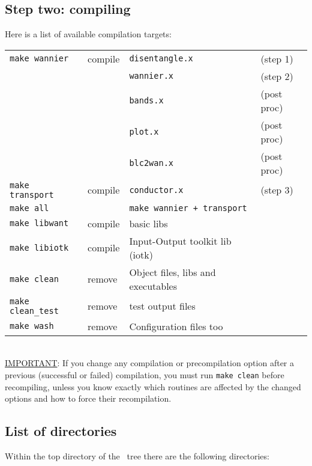 \subsection{Step two: compiling}
\noindent Here is a list of available compilation targets: \\

%
%
\begin{tabular}{llll}
  \texttt{make wannier}    &  compile & \texttt{disentangle.x} &(step 1)\\
  \texttt{}                &          & \texttt{wannier.x}     &(step 2)\\
  \texttt{}                &          & \texttt{bands.x}       &(post proc)\\
  \texttt{}                &          & \texttt{plot.x}        &(post proc)\\
  \texttt{}                &          & \texttt{blc2wan.x}     &(post proc)\\
  \texttt{make transport}  &  compile & \texttt{conductor.x}   &(step 3)\\
  \texttt{make all}        &          & \texttt{make wannier + transport} & \\
  \texttt{make libwant}    &  compile & \WANT{} basic libs       &        \\
  \texttt{make libiotk}    &  compile & Input-Output toolkit lib (iotk)  &        \\
  \texttt{make clean}      &  remove  & Object files, libs and executables &    \\ 
  \texttt{make clean\_test}&  remove  & test output files &    \\ 
  \texttt{make wash}       &  remove  & Configuration files too        &  
\end{tabular}
%
%
\\

\noindent \underline {IMPORTANT}: If you change any compilation or
precompilation option after a previous (successful or failed)
compilation, you must run \texttt{make clean} before recompiling,
unless you know exactly which routines are affected by the changed
options and how to force their recompilation.


\subsection{List of directories}
Within the top directory of the \WANT\ tree there are the
following directories: \\

